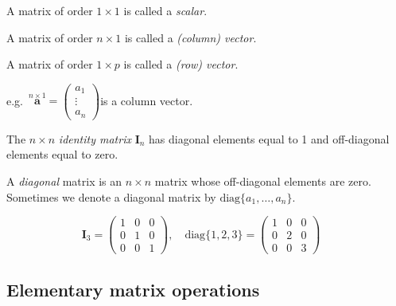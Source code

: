 \documentclass[
]{book}
\theoremstyle{definition}
\theoremstyle{definition}
\theoremstyle{definition}
\theoremstyle{definition}
\theoremstyle{remark}
\begin{document}
A matrix of order \(1\times 1\) is called a \emph{scalar}.

A matrix of order \(n\times 1\) is called a \emph{(column) vector}.

A matrix of order \(1\times p\) is called a \emph{(row) vector}.

e.g.~\(\stackrel{n\times 1}{\mathbf a}=\left( \begin{array}{c} a_1\\\vdots\\a_n \end{array} \right)\)\quad is a column vector.

The \(n\times n\) \emph{identity matrix} \({\mathbf I}_n\) has diagonal elements equal to 1
and off-diagonal elements equal to zero.

A \emph{diagonal} matrix is an \(n \times n\) matrix whose
off-diagonal elements are zero. Sometimes we denote a diagonal
matrix by \(\text{diag}\{a_1,\ldots, a_n\}\).

\[\mathbf I_3 = \left(\begin{array}{ccc} 1&0&0\\ 0&1&0\\ 0&0&1\end{array}\right),\quad \text{diag}\{1,2,3\}=\left(\begin{array}{ccc} 1&0&0\\ 0&2&0\\ 0&0&3\end{array}\right)\quad\]

\hypertarget{elementary-matrix-operations}{%
\subsection{Elementary matrix operations}\label{elementary-matrix-operations}}
\end{document}
